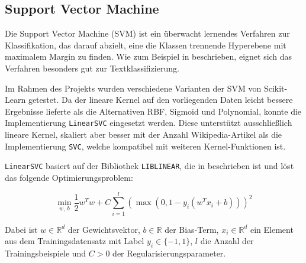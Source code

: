 \subsection{Support Vector Machine}
\label{SVM}

Die Support Vector Machine (SVM) ist ein überwacht lernendes Verfahren zur Klassifikation, das darauf abzielt, eine die Klassen trennende Hyperebene mit maximalem Margin zu finden. Wie zum Beispiel in \cite{Joachims1998} beschrieben, eignet sich das Verfahren besonders gut zur Textklassifizierung.

Im Rahmen des Projekts wurden verschiedene Varianten der SVM von Scikit-Learn \cite{Pedregosa2011} getestet. Da der lineare Kernel auf den vorliegenden Daten leicht bessere Ergebnisse lieferte als die Alternativen RBF, Sigmoid und Polynomial, konnte die Implementierung \texttt{LinearSVC} eingesetzt werden. Diese unterstützt ausschließlich lineare Kernel, skaliert aber besser mit der Anzahl Wikipedia-Artikel als die Implementierung \texttt{SVC}, welche kompatibel mit weiteren Kernel-Funktionen ist.

\texttt{LinearSVC} basiert auf der Bibliothek \texttt{LIBLINEAR}, die in \cite{fan2008liblinear} beschrieben ist und löst das folgende Optimierungsproblem:

\begin{equation*}
  \min_{w,\, b} \frac{1}{2} w^T w + C \sum_{i=1}^{l} \left( \max(0, 1 - y_i (w^T x_i + b)) \right)^2
\end{equation*}

Dabei ist \( w \in \mathbb{R}^d \) der Gewichtsvektor, \( b \in \mathbb{R} \) der Bias-Term, \( x_i \in \mathbb{R}^d \) ein Element aus dem Trainingsdatensatz mit Label \( y_i \in \{-1, 1\} \), \( l \) die Anzahl der Trainingsbeispiele und \( C > 0 \) der Regularisierungsparameter.


